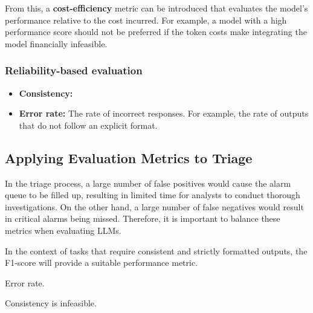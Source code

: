 From this, a \textbf{cost-efficiency} metric can be introduced that evaluates the model's performance relative to the
cost incurred.
For example, a model with a high performance score should not be preferred if the token costs make integrating the model
financially infeasible.

\subsubsection{Reliability-based evaluation}

\begin{itemize}
    \item \textbf{Consistency:}
    \item \textbf{Error rate:} The rate of incorrect responses.
    For example, the rate of outputs that do not follow an explicit format.
\end{itemize}

\subsection{Applying Evaluation Metrics to Triage}
\label{subsec:rq2-evaluating-triage}

In the triage process, a large number of false positives would cause the alarm queue to be filled up, resulting in
limited time for analysts to conduct thorough investigations.
On the other hand, a large number of false negatives would result in critical alarms being missed.
Therefore, it is important to balance these metrics when evaluating LLMs.

In the context of tasks that require consistent and strictly formatted outputs, the F1-score will provide a suitable
performance metric.

Error rate.

Consistency is infeasible.